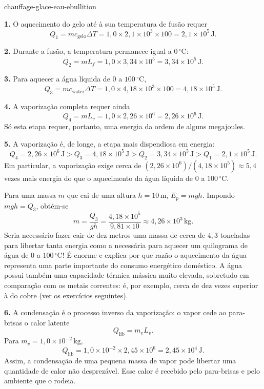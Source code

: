 \begin{exo}{chauffage-glace-eau-ebullition}
\begin{solution}
\textbf{1.} O aquecimento do gelo até à sua temperatura de fusão requer
\[
Q_1=mc_{\text{gelo}}\Delta T
=1{,}0\times2{,}1\times10^3\times100
=2{,}1\times10^5\,\text{J}.
\]

\textbf{2.} Durante a fusão, a temperatura permanece igual a $0\,{}^\circ\text{C}$:
\[
Q_2=mL_f=1{,}0\times3{,}34\times10^5
=3{,}34\times10^5\,\text{J}.
\]

\textbf{3.} Para aquecer a água líquida de $0$ a $100\,{}^\circ\text{C}$,
\[
Q_3=mc_{\text{water}}\Delta T
=1{,}0\times4{,}18\times10^3\times100
=4{,}18\times10^5\,\text{J}.
\]

\textbf{4.} A vaporização completa requer ainda
\[
Q_4=mL_v=1{,}0\times2{,}26\times10^6
=2{,}26\times10^6\,\text{J}.
\]
Só esta etapa requer, portanto, uma energia da ordem de alguns megajoules.

\textbf{5.} A vaporização é, de longe, a etapa mais dispendiosa em energia:
\[
Q_4=2{,}26\times10^6\,\text{J}
>Q_3=4{,}18\times10^5\,\text{J}
>Q_2=3{,}34\times10^5\,\text{J}
>Q_1=2{,}1\times10^5\,\text{J}.
\]
Em particular, a vaporização exige cerca de $(2{,}26\times10^6)/(4{,}18\times10^5)\approx5{,}4$ vezes mais energia do que o aquecimento da água líquida de $0$ a $100\,{}^\circ\text{C}$.

Para uma massa $m$ que cai de uma altura $h=10\,\text{m}$, $E_p=mgh$. Impondo $mgh=Q_3$, obtém-se
\[
m=\frac{Q_3}{gh}
=\frac{4{,}18\times10^5}{9{,}81\times10}
\approx4{,}26\times10^3\,\text{kg}.
\]
Seria necessário fazer cair de dez metros uma massa de cerca de $4{,}3$ toneladas para libertar tanta energia como a necessária para aquecer um quilograma de água de $0$ a $100\,{}^\circ\text{C}$! É enorme e explica por que razão o aquecimento da água representa uma parte importante do consumo energético doméstico. A água possui também uma capacidade térmica mássica muito elevada, sobretudo em comparação com os metais correntes: é, por exemplo, cerca de dez vezes superior à do cobre (ver os exercícios seguintes).

\textbf{6.} A condensação é o processo inverso da vaporização: o vapor cede ao para-brisas o calor latente
\[
Q_{\text{lib}}=m_vL_v.
\]
Para $m_v=1{,}0\times10^{-2}\,\text{kg}$,
\[
Q_{\text{lib}}=1{,}0\times10^{-2}\times2{,}45\times10^6
=2{,}45\times10^4\,\text{J}.
\]
Assim, a condensação de uma pequena massa de vapor pode libertar uma quantidade de calor não desprezável. Esse calor é recebido pelo para-brisas e pelo ambiente que o rodeia.
\end{solution}
\end{exo}

